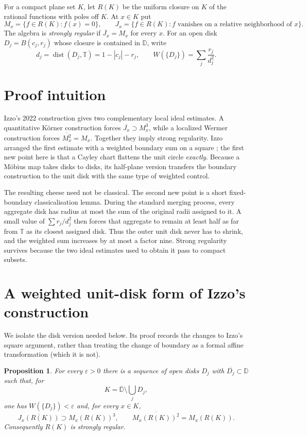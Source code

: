 \documentclass[11pt]{article}
\newtheorem{proposition}[theorem]{Proposition}
\newcommand{\D}{\mathbb D}
\newcommand{\T}{\mathbb T}
\newcommand{\cl}[1]{\overline{#1}}
\begin{document}
For a compact plane set $K$, let $R(K)$ be the uniform closure on $K$ of the
rational functions with poles off $K$.  At $x\in K$ put
\[
 M_x=\{f\in R(K):f(x)=0\},\qquad
 J_x=\{f\in R(K):f\text{ vanishes on a relative neighborhood of }x\}.
\]
The algebra is \emph{strongly regular} if $\cl{J_x}=M_x$ for every $x$.
For an open disk $D_j=B(c_j,r_j)$ whose closure is contained in $\D$, write
\[
          d_j=\operatorname{dist}(D_j,\T)=1-|c_j|-r_j,
          \qquad
          W(\{D_j\})=\sum_j\frac{r_j}{d_j^2}.
\]

\section{Proof intuition}

Izzo's 2022 construction gives two complementary local ideal estimates.  A
quantitative K\"orner construction forces $\cl{J_x}\supset M_x^3$, while a
localized Wermer construction forces $\cl{M_x^2}=M_x$.  Together they imply
strong regularity.  Izzo arranged the first estimate with a weighted boundary
sum on a square \cite{Izzo}; the first new point here is that a Cayley chart
flattens the unit circle \emph{exactly}.  Because a M\"obius map takes disks to
disks, its half-plane version transfers the boundary construction to the unit
disk with the same type of weighted control.

The resulting cheese need not be classical.  The second new point is a short
fixed-boundary classicalisation lemma.  During the standard merging process,
every aggregate disk has radius at most the sum of the original radii assigned
to it.  A small value of $\sum r_j/d_j^2$ then forces that aggregate to remain
at least half as far from $\T$ as its closest assigned disk.  Thus the outer
unit disk never has to shrink, and the weighted sum increases by at most a
factor nine.  Strong regularity survives because the two ideal estimates used
to obtain it pass to compact subsets.

\section{A weighted unit-disk form of Izzo's construction}

We isolate the disk version needed below.  Its proof records the changes to
Izzo's square argument, rather than treating the change of boundary as a
formal affine transformation (which it is not).

\begin{proposition}\label{prop:disk-izzo}
For every $\varepsilon>0$ there is a sequence of open disks $D_j$ with
$\cl{D_j}\subset\D$ such that, for
\[
                 K=\cl\D\setminus\bigcup_jD_j,
\]
one has $W(\{D_j\})<\varepsilon$ and, for every $x\in K$,
\begin{equation}\label{eq:two-ideals}
 \cl{J_x(R(K))}\supset M_x(R(K))^3,
 \qquad
 \cl{M_x(R(K))^2}=M_x(R(K)).
\end{equation}
Consequently $R(K)$ is strongly regular.
\end{proposition}
\end{document}
